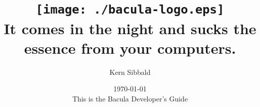 \documentclass[11pt,a4paper]{report}
\begin{document}
\sloppy

\parskip 10pt
\parindent 0pt

\title{\texttt{[image: ./bacula-logo.eps]} \\ \bigskip
   \Large{It comes in the night and sucks the essence
        from your computers.} }
\author{Kern Sibbald}
\date{\vspace{2.0in}\today \\
      This is the Bacula Developer's Guide}
\maketitle

\clearpage
\tableofcontents
\clearpage
\listoffigures
\clearpage
\listoftables
\clearpage
















\clearpage
\printindex
\end{document}
